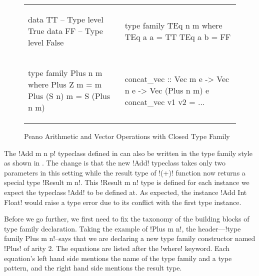 \documentclass[format=sigplan,manuscript,review,screen,nonacm,margin=1in]{acmart}
\begin{document}
\begin{figure}[ht]
  \begin{tabular}{l l}
\begin{code}
data TT -- Type level True
data FF -- Type level False
\end{code}&%
\begin{code}
type family TEq n m where
  TEq a a = TT
  TEq a b = FF
\end{code}\\
\begin{code}
type family Plus n m where
Plus Z     m = m
Plus (S n) m = S (Plus n m)
\end{code}&%
\begin{code}
concat_vec :: Vec m e -> Vec n e -> Vec (Plus n m) e
concat_vec v1 v2 = $\ldots$
\end{code}
  \end{tabular}
  \caption{Peano Arithmetic and Vector Operations with Closed Type Family}
  \label{fig:plus-ty-fam}
\end{figure}
The !Add m n p! typeclass defined in  can also be written in
the type family style as shown in . The change is that the new 
!Add! typeclass takes only two parameters in this setting while the result type
of !(+)! function now returns a special type !Result m n!. This !Result m n! type is defined
for each instance we expect the typeclass !Add! to be defined at.
As expected, the instance !Add Int Float! would raise a type error due to its conflict with
the first type instance. 

Before we go further, we first need to fix the taxonomy of the building blocks of type family declaration.
Taking the example of !Plus m n!, the header---!type family Plus m n!--says that we are
declaring a new type family constructor named !Plus! of arity 2. The equations
are listed after the !where! keyword. Each equation's left hand side mentions
the name of the type family and a type pattern, and the right hand side mentions the result type.
\end{document}
